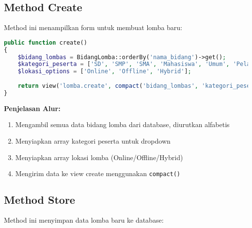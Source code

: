 \documentclass[12pt,a4paper]{article}
\begin{document}
\subsection{Method Create}

Method ini menampilkan form untuk membuat lomba baru:

\begin{lstlisting}[language=PHP]
public function create()
{
    $bidang_lombas = BidangLomba::orderBy('nama_bidang')->get();
    $kategori_peserta = ['SD', 'SMP', 'SMA', 'Mahasiswa', 'Umum', 'Pelajar'];
    $lokasi_options = ['Online', 'Offline', 'Hybrid'];
    
    return view('lomba.create', compact('bidang_lombas', 'kategori_peserta', 'lokasi_options'));
}
\end{lstlisting}

\textbf{Penjelasan Alur:}
\begin{enumerate}
    \item Mengambil semua data bidang lomba dari database, diurutkan alfabetis
    \item Menyiapkan array kategori peserta untuk dropdown
    \item Menyiapkan array lokasi lomba (Online/Offline/Hybrid)
    \item Mengirim data ke view create menggunakan \texttt{compact()}
\end{enumerate}

\subsection{Method Store}

Method ini menyimpan data lomba baru ke database:
\end{document}
